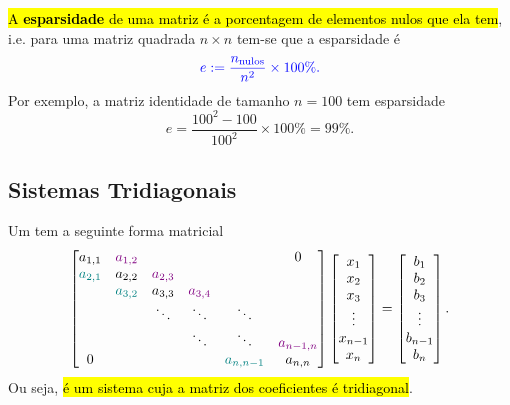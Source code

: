 \hl{A \textbf{esparsidade} de uma matriz é a porcentagem de elementos nulos que ela tem}, i.e. para uma matriz quadrada $n\times n$ tem-se que a esparsidade é
\begin{equation}\color{blue}e := \frac{n_{\text{nulos}}}{n^2}\times 100\%.
\end{equation}
Por exemplo, a matriz identidade de tamanho $n=100$ tem esparsidade
\begin{equation}
  e = \frac{100^2 - 100}{100^2}\times 100\% = 99\% .
\end{equation}

\subsection{Sistemas Tridiagonais}

Um  tem a seguinte forma matricial
\begin{equation}\label{eq:sistridiag}
  \begin{bmatrix}
    a_{1,1} & {\color{violet}a_{1,2}} & & & & 0\\
    {\color{teal}a_{2,1}} & a_{2,2} & {\color{violet}a_{2,3}} & & &\\
    & {\color{teal}a_{3,2}} & a_{3,3} & {\color{violet}a_{3,4}} & &\\
    & & \ddots & \ddots & \ddots &\\
    & & & \ddots & \ddots & {\color{violet}a_{n-1,n}}\\
    0 & & & & {\color{teal}a_{n,n-1}} & a_{n,n}
  \end{bmatrix}
  \begin{bmatrix}
    x_1\\
    x_2\\
    x_3\\
    \vdots\\
    x_{n-1}\\
    x_n
  \end{bmatrix} =
    \begin{bmatrix}
    b_1\\
    b_2\\
    b_3\\
    \vdots\\
    b_{n-1}\\
    b_n
  \end{bmatrix}.
\end{equation}
Ou seja, \hl{é um sistema cuja a matriz dos coeficientes é tridiagonal}.

